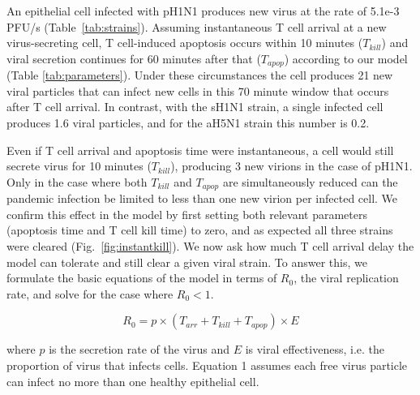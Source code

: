 \documentclass[preprint,10pt,authoryear]{elsarticle}
\begin{document}
An epithelial cell infected with pH1N1 produces new virus at the rate of 5.1e-3 PFU/s (Table~\ref{tab:strains}).  Assuming instantaneous T cell arrival at a new virus-secreting cell, T cell-induced apoptosis occurs within 10 minutes ($T_{kill}$) and viral secretion continues for 60 minutes after that ($T_{apop}$) according to our model (Table \ref{tab:parameters}).  Under these circumstances the cell produces 21 new viral particles that can infect new cells in this 70 minute window that occurs after T cell arrival.  In contrast, with the sH1N1 strain, a single infected cell produces 1.6 viral particles, and for the aH5N1 strain this number is 0.2.  %

Even if T cell arrival and apoptosis time were instantaneous, a cell would still secrete virus for 10 minutes ($T_{kill}$), producing 3 new virions in the case of pH1N1.  Only in the case where both $T_{kill}$ and $T_{apop}$ are simultaneously reduced can the pandemic infection be limited to less than one new virion per infected cell.  We confirm this effect in the model by first setting both relevant parameters (apoptosis time and T cell kill time) to zero, and as expected all three strains were cleared (Fig.~\ref{fig:instantkill}).  We now ask how much T cell arrival delay the model can tolerate and still clear a given viral strain.  To answer this, we formulate the basic equations of the model in terms of $R_0$, the viral replication rate, and solve for the case where $R_0 < 1$.

\begin{equation*}
R_0 = p \times (T_{arr} + T_{kill} + T_{apop}) \times E
\tag{Eq. 3}
\end{equation*}

\noindent where $p$ is the secretion rate of the virus and $E$ is viral effectiveness, i.e. the proportion of virus that infects cells.  Equation 1 assumes each free virus particle can infect no more than one healthy epithelial cell.

\end{document}
